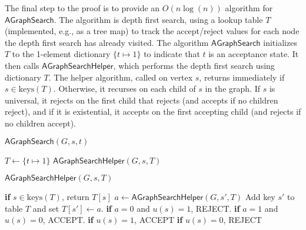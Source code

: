 \documentclass{article}
\begin{document}

The final step to the proof is to provide an $O(n \log(n))$ algorithm for
$\mathsf{AGraphSearch}$. 
The algorithm is depth first search, using a lookup table $T$ (implemented, e.g., as a tree map) to track the accept/reject values for each node the depth first search has already visited.
The algorithm $\mathsf{AGraphSearch}$ initializes $T$ to the 1-element dictionary $\{t \mapsto 1\}$ to indicate that $t$ is an acceptance state.  It then calls $\mathsf{AGraphSearchHelper}$, which performs the depth first search using dictionary $T$.
The helper algorithm, called on vertex $s$, returns immediately if $s \in \text{keys}(T)$.
Otherwise, it recurses on each child of $s$ in the graph.  If $s$ is universal, it rejects on the first child that rejects (and accepts if no children reject), and if it is existential, it accepts on the first accepting child (and rejects if no children accept).

\begin{algorithm}{$\mathsf{AGraphSearch}(G, s, t)$}
\begin{algorithmic}
	\STATE $T \gets \{t \mapsto 1\}$
	\RETURN $\mathsf{AGraphSearchHelper}(G, s, T)$
\end{algorithmic}
\end{algorithm}

\begin{algorithm}{$\mathsf{AGraphSearchHelper}(G, s, T)$}
\begin{algorithmic}
\STATE \textbf{if} $s \in \text{keys}(T)$, return $T[s]$
\STATE $a \gets \mathsf{AGraphSearchHelper}(G, s', T)$
\STATE Add key $s'$ to table $T$ and set $T[s'] \gets a$.
\STATE \textbf{if} $a = 0$ and $u(s) = 1$, REJECT.
\STATE \textbf{if} $a = 1$ and $u(s) = 0$, ACCEPT.
\ENDFOR
\STATE \textbf{if} $u(s) = 1$, ACCEPT
\STATE \textbf{if} $u(s) = 0$, REJECT
\end{algorithmic}
\end{algorithm}
\end{document}
